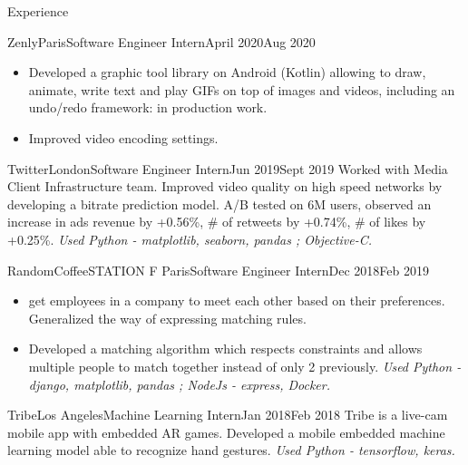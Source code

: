 \documentclass{resume}
\begin{document}
	\begin{rSection}{Experience}
        \begin{job}{Zenly}{Paris}{Software Engineer Intern}{April 2020}{Aug 2020}{
            \begin{itemize}
                \item Developed a graphic tool library on Android (Kotlin) allowing to draw, animate, write text and play GIFs on top of images and videos, including an undo/redo framework: in production work.
                \item Improved video encoding settings.
            \end{itemize}
        }
        \end{job}

		\begin{job}{Twitter}{London}{Software Engineer Intern}{Jun 2019}{Sept 2019}{
            Worked with Media Client Infrastructure team. Improved video quality on high speed networks by developing a bitrate prediction model. A/B tested on 6M users, observed an increase in ads revenue by +0.56\%, \# of retweets by +0.74\%, \# of likes by +0.25\%. \em{Used Python - matplotlib, seaborn, pandas ; Objective-C.}
		}
		\end{job}

		\begin{job}{RandomCoffee}{STATION F Paris}{Software Engineer Intern}{Dec 2018}{Feb 2019}{
            \begin{itemize}
                \item {} get employees in a company to meet each other based on their preferences. Generalized the way of expressing matching rules.
                \item Developed a matching algorithm which respects constraints and allows multiple people to match together instead of only 2 previously. \em{Used Python - django, matplotlib, pandas ; NodeJs - express, Docker.}
            \end{itemize}
		}
		\end{job}

		\begin{job}{Tribe}{Los Angeles}{Machine Learning Intern}{Jan 2018}{Feb 2018}{
			Tribe is a live-cam mobile app with embedded AR games. Developed a mobile embedded machine learning model able to recognize hand gestures. \em{Used Python - tensorflow, keras.}
		}
		\end{job}
	\end{rSection}
\end{document}
